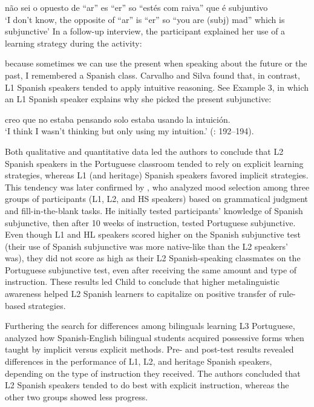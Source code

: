 \documentclass[output=paper]{../langscibook}
\begin{document}
\ea não sei o opuesto de ``ar'' es ``er'' so ``estés com raiva'' que é subjuntivo\\
\glt `I don’t know, the opposite of ``ar'' is ``er'' so ``you are (subj) mad'' which is subjunctive'
\z
In a follow-up interview, the participant explained her use of a learning strategy during the activity:

\ea{} because sometimes we can use the present when speaking about the future or the past, I remembered a Spanish class.\z
Carvalho and Silva found that, in contrast, L1 Spanish speakers tended to apply intuitive reasoning. See Example 3, in which an L1 Spanish speaker explains why she picked the present subjunctive:

\ea creo que no estaba pensando solo estaba usando la intuición.\\
\glt `I think I wasn’t thinking but only using my intuition.' (\citealt{CarvalhoSilva2006}: 192–194).
\z

Both qualitative and quantitative data led the authors to conclude that L2 Spanish speakers in the Portuguese classroom tended to rely on explicit learning strategies, whereas L1 (and heritage) Spanish speakers favored implicit strategies. This tendency was later confirmed by \citet{Child2014}, who analyzed mood selection among three groups of participants (L1, L2, and HS speakers) based on grammatical judgment and fill-in-the-blank tasks. He initially tested participants’ knowledge of Spanish subjunctive, then after 10 weeks of instruction, tested Portuguese subjunctive. Even though L1 and HL speakers scored higher on the Spanish subjunctive test (their use of Spanish subjunctive was more native-like than the L2 speakers’ was), they did not score as high as their L2 Spanish-speaking classmates on the Portuguese subjunctive test, even after receiving the same amount and type of instruction. These results led Child to conclude that higher metalinguistic awareness helped L2 Spanish learners to capitalize on positive transfer of rule-based strategies.

Furthering the search for differences among bilinguals learning L3 Portuguese, \citet{KoikeGualda2008} analyzed how Spanish-English bilingual students acquired possessive forms when taught by implicit versus explicit methods. Pre- and post-test results revealed differences in the performance of L1, L2, and heritage Spanish speakers, depending on the type of instruction they received. The authors concluded that L2 Spanish speakers tended to do best with explicit instruction, whereas the other two groups showed less progress.
\end{document}
